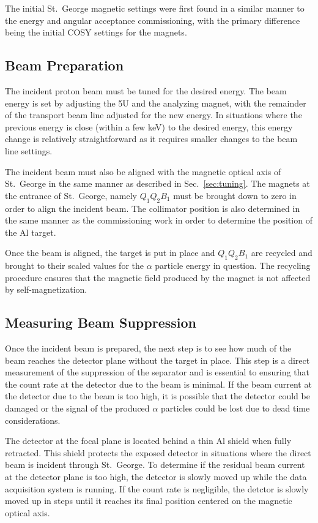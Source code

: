 The initial St.\ George magnetic settings were first found in a similar
manner to the energy and angular acceptance commissioning, with the
primary difference being the initial COSY settings for the magnets.

\subsection{Beam Preparation}

The incident proton beam must be tuned for the desired energy. The beam
energy is set by adjusting the 5U and the analyzing magnet, with the
remainder of the transport beam line adjusted for the new energy. In
situations where the previous energy is close (within a few keV) to the
desired energy, this energy change is relatively straightforward as it
requires smaller changes to the beam line settings.

The incident beam must also be aligned with the magnetic optical axis of
St.\ George in the same manner as described in Sec.~\ref{sec:tuning}.
The magnets at the entrance of St.\ George, namely $Q_1Q_2B_1$ must be
brought down to zero in order to align the incident beam. The collimator
position is also determined in the same manner as the commissioning work
in order to determine the position of the Al target.

Once the beam is aligned, the target is put in place and $Q_1Q_2B_1$ are
recycled and brought to their scaled values for the $\alpha$ particle
energy in question. The recycling procedure ensures that the magnetic
field produced by the magnet is not affected by self-magnetization.

\subsection{Measuring Beam Suppression}

Once the incident beam is prepared, the next step is to see how much of
the beam reaches the detector plane without the target in place. This
step is a direct measurement of the suppression of the separator and is
essential to ensuring that the count rate at the detector due to the
beam is minimal. If the beam current at the detector due to the beam is
too high, it is possible that the detector could be damaged or the
signal of the produced $\alpha$ particles could be lost due to dead time
considerations.

The detector at the focal plane is located behind a thin Al shield when
fully retracted. This shield protects the exposed detector in situations
where the direct beam is incident through St.\ George. To determine if
the residual beam current at the detector plane is too high, the
detector is slowly moved up while the data acquisition system is
running. If the count rate is negligible, the detctor is slowly moved up
in steps until it reaches its final position centered on the magnetic
optical axis.

